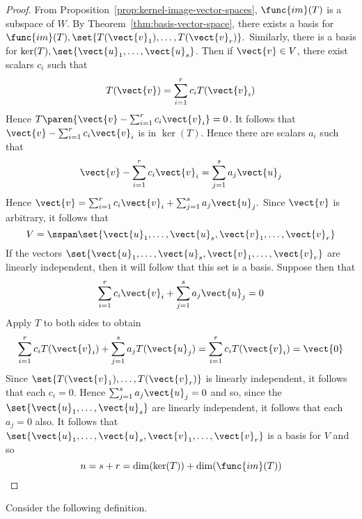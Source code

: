 \begin{proof}
From Proposition~\ref{prop:kernel-image-vector-spaces}, $\func{im}(T) $
is a subspace of $W$. By Theorem~\ref{thm:basis-vector-space}, there exists a basis for $
\func{im}(T) ,\set{T(\vect{v}_{1}),\ldots,T(\vect{v}_{r})}
. $ Similarly, there is a basis for $\ker (T) ,\set{\vect{u}
_{1},\ldots,\vect{u}_{s}}$. Then if $\vect{v}\in V$, there exist
scalars $c_{i}$ such that 
\begin{equation*}
T(\vect{v})=\sum_{i=1}^{r}c_{i}T(\vect{v}_{i})
\end{equation*}
Hence $T\paren{\vect{v}-\sum_{i=1}^{r}c_{i}\vect{v}_{i}} =0$. It follows
that $\vect{v}-\sum_{i=1}^{r}c_{i}\vect{v}_{i}$ is in $\ker (T)$.
Hence there are scalars $a_{i}$ such that 
\begin{equation*}
\vect{v}-\sum_{i=1}^{r}c_{i}\vect{v}_{i}=\sum_{j=1}^{s}a_{j}\vect{u}_{j}
\end{equation*}
Hence $\vect{v}=\sum_{i=1}^{r}c_{i}\vect{v}_{i}+\sum_{j=1}^{s}a_{j}\vect{u}
_{j}. $ Since $\vect{v}$ is arbitrary, it follows that 
\begin{equation*}
V=\sspan\set{\vect{u}_{1},\ldots,\vect{u}_{s},\vect{v}_{1},\ldots,
\vect{v}_{r}}
\end{equation*}
If the vectors $\set{\vect{u}_{1},\ldots,\vect{u}_{s},\vect{v}_{1},\ldots,
\vect{v}_{r}} $ are linearly independent, then it will follow that
this set is a basis. Suppose then that 
\begin{equation*}
\sum_{i=1}^{r}c_{i}\vect{v}_{i}+\sum_{j=1}^{s}a_{j}\vect{u}_{j}=0
\end{equation*}
Apply $T$ to both sides to obtain 
\begin{equation*}
\sum_{i=1}^{r}c_{i}T(\vect{v}_{i})+\sum_{j=1}^{s}a_{j}T(\vect{u}
_{j})=\sum_{i=1}^{r}c_{i}T(\vect{v}_{i})= \vect{0}
\end{equation*}
Since $\set{T(\vect{v}_{1}),\ldots,T(\vect{v}_{r})} $ is linearly
independent, it follows that each $c_{i}=0$. Hence $\sum_{j=1}^{s}a_{j}\vect{u
}_{j}=0$ and so, since the $\set{\vect{u}_{1},\ldots,\vect{u}_{s}} $
are linearly independent, it follows that each $a_{j}=0$ also. It follows
that $\set{\vect{u}_{1},\ldots,\vect{u}_{s},\vect{v}_{1},\ldots,\vect{v}
_{r}} $ is a basis for $V$ and so 
\begin{equation*}
n=s+r=\dim (\ker (T)) +\dim (\func{im}(
T))
\end{equation*}
\end{proof}

Consider the following definition. 

